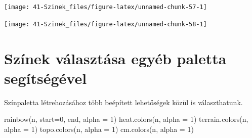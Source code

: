 \documentclass[
]{book}
\newenvironment{Shaded}{\begin{snugshade}}{\end{snugshade}}
\newcommand{\AttributeTok}[1]{\textcolor[rgb]{0.77,0.63,0.00}{#1}}
\newcommand{\ConstantTok}[1]{\textcolor[rgb]{0.00,0.00,0.00}{#1}}
\newcommand{\DecValTok}[1]{\textcolor[rgb]{0.00,0.00,0.81}{#1}}
\newcommand{\FloatTok}[1]{\textcolor[rgb]{0.00,0.00,0.81}{#1}}
\newcommand{\FunctionTok}[1]{\textcolor[rgb]{0.00,0.00,0.00}{#1}}
\newcommand{\NormalTok}[1]{#1}
\newcommand{\SpecialCharTok}[1]{\textcolor[rgb]{0.00,0.00,0.00}{#1}}
\newcommand{\StringTok}[1]{\textcolor[rgb]{0.31,0.60,0.02}{#1}}
\begin{document}
\begin{center}\texttt{[image: 41-Szinek\_files/figure-latex/unnamed-chunk-57-1]} \end{center}

\begin{Shaded}
\end{Shaded}

\begin{center}\texttt{[image: 41-Szinek\_files/figure-latex/unnamed-chunk-58-1]} \end{center}

\hypertarget{szinek-valasztasa-egyeb}{%
\section{Színek választása egyéb paletta segítségével}\label{szinek-valasztasa-egyeb}}

Színpaletta létrehozásához több beépített lehetőségek közül is választhatunk.

\begin{Shaded}
\begin{Highlighting}[]
\FunctionTok{rainbow}\NormalTok{(n, }\AttributeTok{start=}\DecValTok{0}\NormalTok{, end, }\AttributeTok{alpha =} \DecValTok{1}\NormalTok{)}
\FunctionTok{heat.colors}\NormalTok{(n, }\AttributeTok{alpha =} \DecValTok{1}\NormalTok{)}
\FunctionTok{terrain.colors}\NormalTok{(n, }\AttributeTok{alpha =} \DecValTok{1}\NormalTok{)}
\FunctionTok{topo.colors}\NormalTok{(n, }\AttributeTok{alpha =} \DecValTok{1}\NormalTok{)}
\FunctionTok{cm.colors}\NormalTok{(n, }\AttributeTok{alpha =} \DecValTok{1}\NormalTok{)}
\end{Highlighting}
\end{Shaded}
\end{document}
